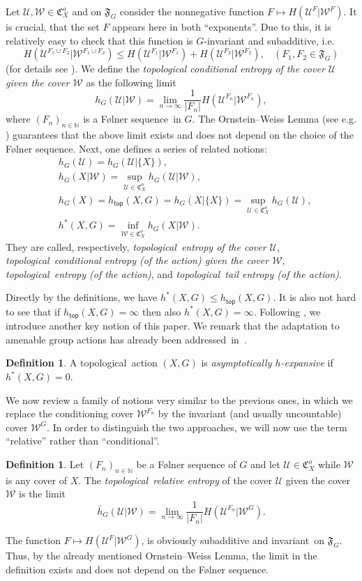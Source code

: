 \documentclass[12pt]{amsart}
\theoremstyle{definition}
\newtheorem{definition}[theorem]{Definition}
\numberwithin{equation}{section}
\newcommand{\CU}{\mathcal{U}}
\newcommand{\CW}{\mathcal{W}}
\newcommand{\GC}{\mathfrak{C}}
\newcommand{\GF}{\mathfrak{F}}
\def \N {\mathbb N}
\def \htop {h_{\mathsf{top}}}
\def \sq {sequence}
\def \tl {topological}
\def \inv {invariant}
\def \htop{h_{\mathsf{top}}}
\def \ahe {asympto\-ti\-cally $h$-ex\-pan\-sive}
\def \N {\mathbb N}
\def \CU {\mathcal U}
\def \htop {h_{\mathsf{top}}}
\def \sq {sequence}
\def \tl {topological}
\def \inv {invariant}
\def \htop{h_{\mathsf{top}}}
\begin{document}
Let $\CU,\CW\in\GC^o_X$ and on $\GF_G$ consider the nonnegative function $F\mapsto H(\CU^F|\CW^F)$. It is crucial, that the set $F$ appears here in both ``exponents''. Due to this, it is relatively easy to check that this function is $G$-invariant and subadditive, i.e. 
$$
H(\CU^{F_1\cup F_2}|\CW^{F_1\cup F_2})\le H(\CU^{F_1}|\CW^{F_1})+ H(\CU^{F_2}|\CW^{F_2}),\ \ \ \ (F_1, F_2\in \mathfrak{F}_G)
$$ 
(for details see \cite[Lemma 5.2]{ChungZhang}). We define the \emph{topological conditional entropy of the cover $\CU$ given the cover $\CW$} as the following limit
$$
h_G(\CU| \CW) = \lim_{n\rightarrow \infty} \frac{1}{|F_n|} H(\CU^{F_n}|\CW^{F_n}),
$$
where $(F_n)_{n\in\N}$ is a F\o lner \sq\ in $G$. The Ornstein--Weiss Lemma (see e.g. \cite[1.3.1]{Gronew}) guarantees that the above limit exists and does not depend on the choice of the F\o lner sequence. Next, one defines a series of related notions:
\begin{align*}
&h_G(\CU)=h_G(\CU|\{X\}),\\
&h_G(X|\CW)= \sup_{\CU\in \GC_X^o} h_G(\CU| \CW),\\
&h_G(X) = \htop(X,G) = h_G(X|\{X\})=\sup_{\CU\in \GC_X^o} h_G(\CU),\\
&h^*(X,G)= \inf_{\CW\in \GC_X^o} h_G(X|\CW).
\end{align*}
They are called, respectively, \emph{\tl\ entropy of the cover $\CU$}, 
\emph{\tl\ conditional entropy (of the action) given the cover $\CW$},
\emph{\tl\ entropy (of the action)}, and \emph{\tl\ tail entropy (of the action)}.

Directly by the definitions, we have $h^*(X,G)\le\htop(X,G)$. It is also not hard to see that if $\htop(X,G)=\infty$ then also $h^*(X,G)=\infty$. Following \cite{Mi1}, we introduce another key notion of this paper. We remark that the adaptation to amenable group actions has already been addressed~in~\cite{ChungZhang}.
\begin{definition}
A \tl\ action $(X,G)$ is \emph{\ahe} if $h^*(X,G)=0$.
\end{definition}

\smallskip

We now review a family of notions very similar to the previous ones, in which we replace the conditioning cover $\CW^{F_n}$ by the invariant (and usually uncountable) cover $\CW^G$. In order to distinguish the two approaches, we will now use the term ``relative'' rather than ``conditional''. 
\begin{definition}
Let $(F_n)_{n\in \mathbb{N}}$ be a F\o lner sequence of $G$ and let $\CU\in\GC_X^o$ while $\CW$ is any cover of $X$. The \emph{\tl\ relative entropy} of the cover $\CU$ given the cover $\CW$ is the limit
$$
\bar h_G(\CU|\CW)= \lim_{n\rightarrow \infty}\frac{1}{|F_n|}H(\CU^{F_n}|\CW^G).
$$
\end{definition}
The function $F\mapsto H(\CU^F|\CW^G)$, is obviously subadditive and \inv\ on $\GF_G$. Thus, by the already mentioned Ornstein--Weiss Lemma, the limit in the definition exists and does not depend on the F\o lner \sq. 
\end{document}
